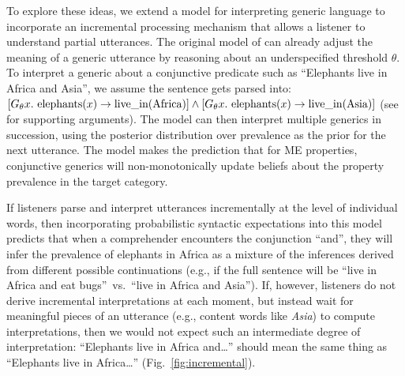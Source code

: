 \documentclass[letterpaper, 12pt]{article}
\begin{document}
To explore these ideas, we extend a model for interpreting generic language to incorporate an incremental processing mechanism that allows a listener to understand partial utterances.
The original model of  can already adjust the meaning of a generic utterance by reasoning about an underspecified threshold $\theta$.
To interpret a generic about a conjunctive predicate such as ``Elephants live in Africa and Asia'', we assume the sentence gets parsed into: $[G_\theta x. \textnormal{ elephants}(x) \to \textnormal{live\_in}(\textnormal{Africa})] \land [G_\theta x. \textnormal{ elephants}(x) \to \textnormal{live\_in}(\textnormal{Asia})]$ (see  for supporting arguments).
The model can then interpret multiple generics in succession, using the posterior distribution over prevalence as the prior for the next utterance. 
The model makes the prediction that for ME properties, conjunctive generics will non-monotonically update beliefs about the property prevalence in the target category. 

If listeners parse and interpret utterances incrementally at the level of individual words, then incorporating probabilistic syntactic expectations \cite{Levy2008} into this model predicts that when a comprehender encounters the conjunction ``and'', they will infer the prevalence of elephants in Africa as a mixture of the inferences derived from different possible continuations (e.g., if the full sentence will be ``live in Africa and eat bugs''~vs.~``live in Africa and Asia'').
If, however, listeners do not derive incremental interpretations at each moment, but instead wait for meaningful pieces of an utterance (e.g., content words like \emph{Asia}) to compute interpretations, then we would not expect such an intermediate degree of interpretation: ``Elephants live in Africa and\ldots'' should mean the same thing as ``Elephants live in Africa\ldots'' (Fig.~\ref{fig:incremental}). 

\end{document}
